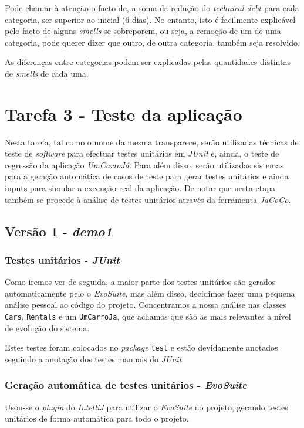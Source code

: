 \documentclass[a4paper]{report}
\begin{document}
Pode chamar à atenção o facto de, a soma da redução do \textit{technical debt} para cada categoria, ser superior ao inicial (6 dias).
No entanto, isto é facilmente explicável pelo facto de alguns \textit{smells} se sobreporem, ou seja, a remoção de um de uma categoria, pode querer dizer que outro, de outra categoria, também seja resolvido.

As diferenças entre categorias podem ser explicadas pelas quantidades distintas de \textit{smells} de cada uma.

\section{Tarefa 3 - Teste da aplicação}
Nesta tarefa, tal como o nome da mesma transparece, serão utilizadas técnicas de teste de \textit{software} para efectuar testes unitários em \textit{JUnit} e, ainda, o
teste de regressão da aplicação \textit{UmCarroJá}. Para além disso, serão utilizadas sistemas para a geração automática de casos de teste para gerar testes unitários e ainda inputs para simular a execução real da aplicação. De notar que nesta etapa também se procede à análise de testes unitários através da ferramenta \textit{JaCoCo}.

\subsection{Versão 1 - \textit{demo1}}

\subsubsection{Testes unitários - \textit{JUnit}}

Como iremos ver de seguida, a maior parte dos testes unitários são gerados automaticamente pelo o \textit{EvoSuite}, mas além disso, decidimos fazer uma pequena análise pessoal ao código do projeto.
Concentramos a nossa análise nas classes \texttt{Cars}, \texttt{Rentals} e um \texttt{UmCarroJa}, que achamos que são as mais relevantes a nível de evolução do sistema.

Estes testes foram colocados no \textit{package} \texttt{test} e estão devidamente anotados seguindo a anotação dos testes manuais do \textit{JUnit}.

\subsubsection{Geração automática de testes unitários - \textit{EvoSuite}}
Usou-se o \textit{plugin} do \textit{IntelliJ} para utilizar o \textit{EvoSuite} no projeto, gerando testes unitários de forma automática para todo o projeto.
\end{document}

